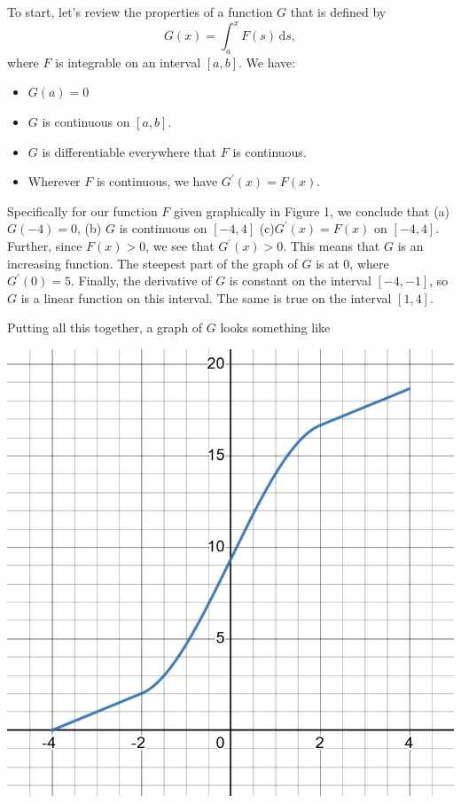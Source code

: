 \documentclass[12pt,fleqn,answers]{exam}
\begin{document}
\begin{solution}

To start, let's review the properties of a function $G$ that is defined by
\begin{equation*}
    G(x) = \int_{a}^x F(s) \, \mathrm{d}s,
\end{equation*} 
where $F$ is integrable on an interval $[a,b]$. We have:

\begin{itemize}
\item $G(a)=0$
\item $G$ is continuous on $[a,b]$.
\item $G$ is differentiable everywhere that $F$ is continuous.
\item Wherever $F$ is continuous, we have $G^\prime(x) = F(x)$.
\end{itemize}
Specifically for our function $F$ given graphically in Figure 1, we 
conclude that (a) $G(-4) = 0$, (b) $G$ is continuous on $[-4,4]$  
  (c)$G^\prime(x) = F(x)$  on $[-4,4]$. Further, since 
 $F(x) > 0$, we see 
  that $G^\prime(x) > 0$. This means that $G$ is an increasing 
  function. The steepest part of the graph of $G$ is at $0$, where
  $G^\prime(0) = 5$.  Finally, the derivative of $G$ is constant on 
  the interval $[-4,-1]$, so $G$ is a linear function on this interval.
  The same is true on the interval $[1,4]$.

  Putting all this together, a graph of $G$ looks something like

  \vfill 
  \newpage 
    \begin{center}
    \includegraphics[scale=0.4]{desmos-graph(51).png}
  \end{center}


\end{solution}
\end{document}
